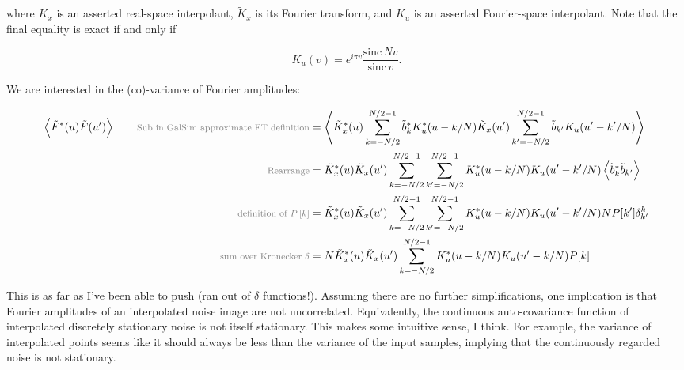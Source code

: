 \documentclass{article}
\newcommand*{\annot}[1]{\tag*{\footnotesize{\textcolor{gray}{#1}}}}
\begin{document}
where $K_x$ is an asserted real-space interpolant, $\tilde{K}_x$ is its Fourier transform,
and $K_u$ is an asserted Fourier-space interpolant.  Note that the final equality is exact if and
only if

\begin{equation}
    K_u(v) = e^{i \pi v} \frac{\mathrm{sinc}\, N v}{\mathrm{sinc}\, v}.
\end{equation}

We are interested in the (co)-variance of Fourier amplitudes:

\begin{align}
    \left\langle \tilde{F}^*(u) \tilde{F}(u^\prime)\right\rangle
    \annot{Sub in GalSim approximate FT definition}
    &= \left\langle \tilde{K}_x^*(u) \sum_{k=-N/2}^{N/2-1}\tilde{b}_k^* K_u^*(u-k/N) \tilde{K}_x(u^\prime) \sum_{k^\prime=-N/2}^{N/2-1}\tilde{b}_{k^\prime} K_u(u^\prime-k^\prime/N)  \right\rangle \\
    \annot{Rearrange}
    &= \tilde{K}_x^*(u) \tilde{K}_x(u^\prime) \sum_{k=-N/2}^{N/2-1} \sum_{k^\prime=-N/2}^{N/2-1} K_u^*(u-k/N) K_u(u^\prime-k^\prime/N) \left\langle \tilde{b}_k^* \tilde{b}_{k^\prime} \right\rangle \\
    \annot{definition of $P\left[k\right]$}
    &= \tilde{K}_x^*(u) \tilde{K}_x(u^\prime) \sum_{k=-N/2}^{N/2-1} \sum_{k^\prime=-N/2}^{N/2-1} K_u^*(u-k/N) K_u(u^\prime-k^\prime/N) N P[k^\prime]\delta_{k^\prime}^k \\
    \annot{sum over Kronecker $\delta$}
    &= N \tilde{K}_x^*(u) \tilde{K}_x(u^\prime) \sum_{k=-N/2}^{N/2-1} K_u^*(u-k/N) K_u(u^\prime-k/N) P[k]
\end{align}

This is as far as I've been able to push (ran out of $\delta$ functions!).  Assuming there are no
further simplifications, one implication is that Fourier amplitudes of an interpolated noise image
are not uncorrelated.  Equivalently, the continuous auto-covariance function of interpolated
discretely stationary noise is not itself stationary.  This makes some intuitive sense, I think.
For example, the variance of interpolated points seems like it should always be less than the
variance of the input samples, implying that the continuously regarded noise is not stationary.
\end{document}
